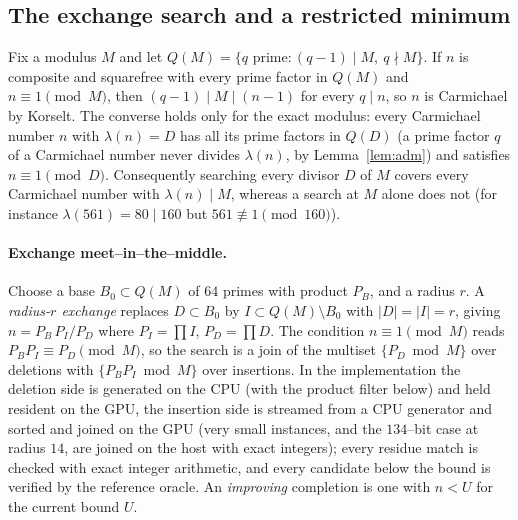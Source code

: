 \documentclass[11pt]{article}
\theoremstyle{definition}
\begin{document}
\subsection{The exchange search and a restricted minimum}\label{sec:exchange}

Fix a modulus $M$ and let $Q(M)=\{q \text{ prime}: (q-1)\mid M,\ q\nmid M\}$. If $n$ is composite and
squarefree with every prime factor in $Q(M)$ and $n\equiv 1\pmod M$, then $(q-1)\mid M\mid(n-1)$ for
every $q\mid n$, so $n$ is Carmichael by Korselt. The converse holds only for the exact modulus: every
Carmichael number $n$ with $\lambda(n)=D$ has all its prime factors in $Q(D)$ (a prime factor $q$ of a
Carmichael number never divides $\lambda(n)$, by Lemma~\ref{lem:adm}) and satisfies $n\equiv1\pmod D$.
Consequently searching every divisor $D$ of $M$ covers every Carmichael number with $\lambda(n)\mid M$,
whereas a search at $M$ alone does not (for instance $\lambda(561)=80\mid160$ but $561\not\equiv1\pmod{160}$).

\paragraph{Exchange meet--in--the--middle.}
Choose a base $B_0\subset Q(M)$ of $64$ primes with product $P_B$, and a radius $r$. A
\emph{radius-$r$ exchange} replaces $D\subset B_0$ by $I\subset Q(M)\setminus B_0$ with $|D|=|I|=r$,
giving $n=P_B\,P_I/P_D$ where $P_I=\prod I$, $P_D=\prod D$. The condition $n\equiv1\pmod M$ reads
$P_B P_I\equiv P_D\pmod M$, so the search is a join of the multiset $\{P_D \bmod M\}$ over deletions
with $\{P_B P_I\bmod M\}$ over insertions. In the implementation the deletion side is generated on the
CPU (with the product filter below) and held resident on the GPU, the insertion side is streamed from
a CPU generator and sorted and joined on the GPU (very small instances, and the $134$--bit case at
radius $14$, are joined on the host with exact integers); every residue match is checked with exact
integer arithmetic, and every candidate below the bound is verified by the reference oracle. An
\emph{improving} completion is one with $n<U$ for the current bound $U$.
\end{document}
